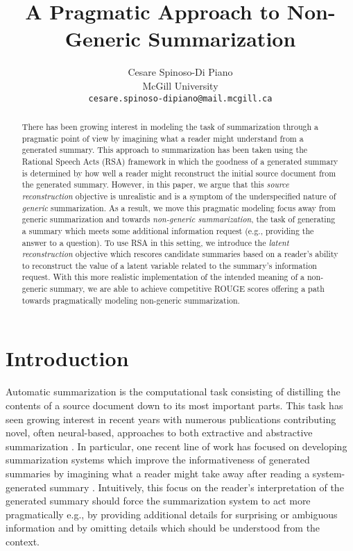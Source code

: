 \documentclass[11pt]{article}
\title{A Pragmatic Approach to Non-Generic Summarization}
\author{
Cesare Spinoso-Di Piano \\
McGill University \\
\texttt{cesare.spinoso-dipiano@mail.mcgill.ca}
}
\begin{document}
\maketitle

\begin{abstract}
    There has been growing interest in modeling the task of summarization through a pragmatic point of view by imagining what a reader might understand from a generated summary. This approach to summarization has been taken using the Rational Speech Acts (RSA) framework in which the goodness of a generated summary is determined by how well a reader might reconstruct the initial source document from the generated summary. However, in this paper, we argue that this \emph{source reconstruction} objective is unrealistic and is a symptom of the underspecified nature of \emph{generic} summarization. As a result, we move this pragmatic modeling focus away from generic summarization and towards \emph{non-generic summarization}, the task of generating a summary which meets some additional information request (e.g., providing the answer to a question). To use RSA in this setting, we introduce the \emph{latent reconstruction} objective which rescores candidate summaries based on a reader's ability to reconstruct the value of a latent variable related to the summary's information request. With this more realistic implementation of the intended meaning of a non-generic summary, we are able to achieve competitive ROUGE scores offering a path towards pragmatically modeling non-generic summarization.
\end{abstract}


\section{Introduction}

Automatic summarization is the computational task consisting of distilling the contents of a source document down to its most important parts. This task has seen growing interest in recent years with numerous publications contributing novel, often neural-based, approaches to both extractive and abstractive summarization \citep{rush-etal-2015-neural,nallapati-etal-2016-abstractive,see-etal-2017-get}. In particular, one recent line of work has focused on developing summarization systems which improve the informativeness of generated summaries by imagining what a reader might take away after reading a system-generated summary \citep{shen-etal-2019-pragmatically}. Intuitively, this focus on the reader's interpretation of the generated summary should force the summarization system to act more pragmatically e.g., by providing additional details for surprising or ambiguous information and by omitting details which should be understood from the context.
\end{document}
